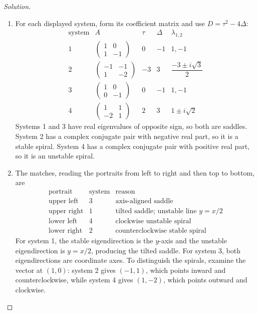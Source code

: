 \documentclass[12pt]{amsart}
\theoremstyle{conjecture}
\theoremstyle{definition}
\theoremstyle{question}
\theoremstyle{theorem}
\newenvironment{solution}
{\begin{proof}[Solution]}
{\end{proof}}
\begin{document}
\begin{solution}
\begin{enumerate}
            \item[(f)] For each displayed system, form its coefficient matrix and use
            $D=\tau^2-4\Delta$:
            \[
                \begin{array}{c|c|c|c|c}
                    \text{system}&A&\tau&\Delta&\lambda_{1,2}\\ \hline
                    1&\begin{pmatrix}1&0\\1&-1\end{pmatrix}&0&-1&1,-1\\[6pt]
                    2&\begin{pmatrix}-1&-1\\1&-2\end{pmatrix}&-3&3&
                    \dfrac{-3\pm i\sqrt3}{2}\\[8pt]
                    3&\begin{pmatrix}1&0\\0&-1\end{pmatrix}&0&-1&1,-1\\[6pt]
                    4&\begin{pmatrix}1&1\\-2&1\end{pmatrix}&2&3&1\pm i\sqrt2
                \end{array}
            \]
            Systems 1 and 3 have real eigenvalues of opposite sign, so both are
            saddles. System 2 has a complex conjugate pair with negative real part, so
            it is a stable spiral. System 4 has a complex conjugate pair with positive
            real part, so it is an unstable spiral.

            \item[(g)] The matches, reading the portraits from left to right and then
            top to bottom, are
            \[
                \begin{array}{c|c|l}
                    \text{portrait}&\text{system}&\text{reason}\\ \hline
                    \text{upper left}&3&\text{axis-aligned saddle}\\
                    \text{upper right}&1&\text{tilted saddle; unstable line }y=x/2\\
                    \text{lower left}&4&\text{clockwise unstable spiral}\\
                    \text{lower right}&2&\text{counterclockwise stable spiral}
                \end{array}
            \]
            For system 1, the stable eigendirection is the $y$-axis and the unstable
            eigendirection is $y=x/2$, producing the tilted saddle. For system 3, both
            eigendirections are coordinate axes. To distinguish the spirals, examine
            the vector at $(1,0)$: system 2 gives $(-1,1)$, which points inward and
            counterclockwise, while system 4 gives $(1,-2)$, which points outward and
            clockwise.
        \end{enumerate}
    \end{solution}
\end{document}
